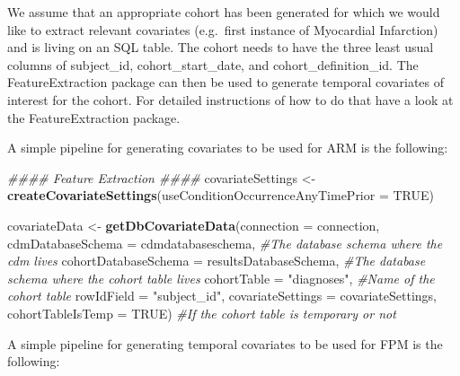 \documentclass[
]{article}
\newenvironment{Shaded}{\begin{snugshade}}{\end{snugshade}}
\newcommand{\CommentTok}[1]{\textcolor[rgb]{0.56,0.35,0.01}{\textit{#1}}}
\newcommand{\DataTypeTok}[1]{\textcolor[rgb]{0.13,0.29,0.53}{#1}}
\newcommand{\KeywordTok}[1]{\textcolor[rgb]{0.13,0.29,0.53}{\textbf{#1}}}
\newcommand{\NormalTok}[1]{#1}
\newcommand{\OtherTok}[1]{\textcolor[rgb]{0.56,0.35,0.01}{#1}}
\newcommand{\StringTok}[1]{\textcolor[rgb]{0.31,0.60,0.02}{#1}}
\begin{document}
We assume that an appropriate cohort has been generated for which we
would like to extract relevant covariates (e.g.~first instance of
Myocardial Infarction) and is living on an SQL table. The cohort needs
to have the three least usual columns of subject\_id,
cohort\_start\_date, and cohort\_definition\_id. The FeatureExtraction
package can then be used to generate temporal covariates of interest for
the cohort. For detailed instructions of how to do that have a look at
the FeatureExtraction package.

A simple pipeline for generating covariates to be used for ARM is the
following:

\begin{Shaded}
\begin{Highlighting}[]
\CommentTok{#### Feature Extraction ####}
\NormalTok{covariateSettings <-}\StringTok{ }\KeywordTok{createCovariateSettings}\NormalTok{(}\DataTypeTok{useConditionOccurrenceAnyTimePrior =} \OtherTok{TRUE}\NormalTok{)}

\NormalTok{covariateData <-}\StringTok{ }\KeywordTok{getDbCovariateData}\NormalTok{(}\DataTypeTok{connection =}\NormalTok{ connection, }
                                    \DataTypeTok{cdmDatabaseSchema =}\NormalTok{ cdmdatabaseschema, }\CommentTok{#The database schema where the cdm lives}
                                    \DataTypeTok{cohortDatabaseSchema =}\NormalTok{ resultsDatabaseSchema, }\CommentTok{#The database schema where the cohort table lives}
                                    \DataTypeTok{cohortTable =} \StringTok{"diagnoses"}\NormalTok{, }\CommentTok{#Name of the cohort table}
                                    \DataTypeTok{rowIdField =} \StringTok{"subject_id"}\NormalTok{, }
                                    \DataTypeTok{covariateSettings =}\NormalTok{ covariateSettings, }
                                    \DataTypeTok{cohortTableIsTemp =} \OtherTok{TRUE}\NormalTok{) }\CommentTok{#If the cohort table is temporary or not}
\end{Highlighting}
\end{Shaded}

A simple pipeline for generating temporal covariates to be used for FPM
is the following:
\end{document}
